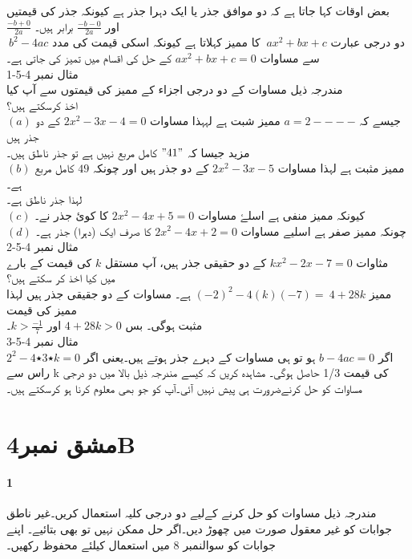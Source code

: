 بعض اوقات کہا جاتا ہے کہ دو موافق جذر یا ایک دہرا جذر ہے کیونکہ جذر کی قیمتیں \\
$ \frac{-b + 0}{2a}$ اور $ \frac{-b-0}{2a} $ برابر ہیں۔\\ 
$\ b^{2}-4ac$ دو درجی عبارت $\ ax^{2}+bx+c$ کا ممیز کہلاتا ہے کیونکہ اسکی قیمت کی مدد سے مساوات $ax^{2}+bx+c=0$ کے حل کی اقسام میں تمیز کی جاتی ہے۔\\
مثال نمبر 4-5-1
\\
مندرجہ ذیل مساوات کے دو درجی اجزاء کے ممیز کی قیمتوں سے آپ کیا\\
 اخذ کرسکتے ہیں؟\\
$(a)$ جیسے کہ $a=2----$ ممیز شبت ہے لہہذا مساوات $2x^{2}-3x-4=0$ کے دو جذر ہیں \\
مزید جیسا کہ $"41"$ کامل مربع نہیں ہے تو جذر ناطق ہیں۔\\
$(b)$ ممیز مثبت ہے  لہذا مساوات $2x^{2}-3x-5$ کے دو جذر ہیں اور چونکہ $49$ کامل مربع ہے۔\\
لہذا جذر ناطق ہے۔\\
$(c)$ کیونکہ ممیز منفی ہے اسلۓ مساوات $2x^{2}-4x+5=0$ کا کوئ جذر نے۔\\
\newpage
$ \hspace{10pt} $\\
$(d)$ چونکہ ممیز صفر ہے اسلیے مساوات $2x^{2}-4x+2=0$ کا صرف ایک (دہرا) جذر ہے۔\\
مثال نمبر 4-5-2\\
مثاوات $kx^{2}-2x-7=0$ کے دو حقیقی جذر ہیں، آپ مستقل $k$ کی قیمت کے بارے\\
میں کیا اخذ کر سکتے ہیں؟\\
ممیز $(-2)^{2}-4(k)(-7)=\ 4 + 28k$ ہے۔ مساوات کے دو جقیقی جذر ہیں لہذا ممیز کی قیمت\\
مثبت ہوگی۔ بس $4+28k>0$ اور $k>\frac{-1}{7}$۔\\
مثال نمبر 4-5-3\\

اگر $ b-4ac=0 $ ہو تو ہی مساوات کے دہرے جذر ہوتے ہيں۔يعنی اگر $ 2^2-4٭3٭k=0 $ راس سے k کی قيمت 1/3 حاصل ہوگی۔
مشاہدہ کريں کہ کيسے مندرجہ ذيل بالا ميں دو درجی مساوات کو حل کرنےضرورت ہی پيش نہيں آئی۔آپ کو جو بھی معلوم کرنا ہو کرسکتے ہيں۔
\section{مشق نمبر4B}
\paragraph{1} \quad مندرجہ ذيل مساوات کو حل کرنے کےليے دو درجی کليہ استعمال کريں۔غير ناطق جوابات کو غير معقول صورت ميں چھوڑ ديں۔اگر حل ممکن نہيں تو بھی بتائيے۔
اپنے جوابات کو سوالنمبر 8 ميں استعمال کيلئے محفوظ رکھيں۔

